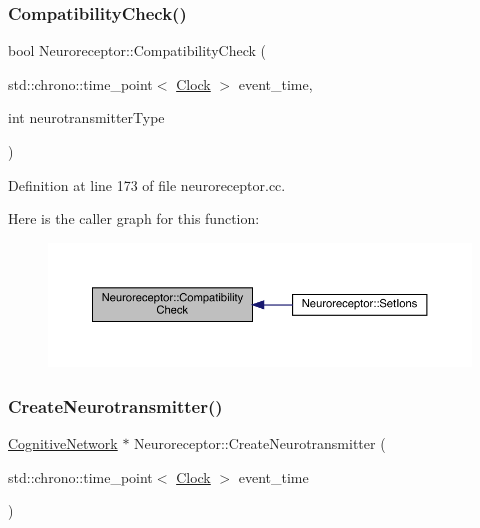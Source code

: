 \subsubsection{\texorpdfstring{Compatibility\+Check()}{CompatibilityCheck()}}
{\footnotesize\ttfamily bool Neuroreceptor\+::\+Compatibility\+Check (\begin{DoxyParamCaption}\item[{std\+::chrono\+::time\+\_\+point$<$ \hyperlink{universe_8h_a0ef8d951d1ca5ab3cfaf7ab4c7a6fd80}{Clock} $>$}]{event\+\_\+time,  }\item[{int}]{neurotransmitter\+Type }\end{DoxyParamCaption})}



Definition at line 173 of file neuroreceptor.\+cc.

Here is the caller graph for this function\+:\nopagebreak
\begin{figure}[H]
\begin{center}
\leavevmode
\includegraphics[width=350pt]{class_neuroreceptor_a5d54ca353f0be78522aacc4fca06db63_icgraph}
\end{center}
\end{figure}
\mbox{\label{class_neuroreceptor_af671059884336eadbc367f9d8556eb3f}} 
\subsubsection{\texorpdfstring{Create\+Neurotransmitter()}{CreateNeurotransmitter()}}
{\footnotesize\ttfamily \hyperlink{class_cognitive_network}{Cognitive\+Network} $\ast$ Neuroreceptor\+::\+Create\+Neurotransmitter (\begin{DoxyParamCaption}\item[{std\+::chrono\+::time\+\_\+point$<$ \hyperlink{universe_8h_a0ef8d951d1ca5ab3cfaf7ab4c7a6fd80}{Clock} $>$}]{event\+\_\+time }\end{DoxyParamCaption})}



